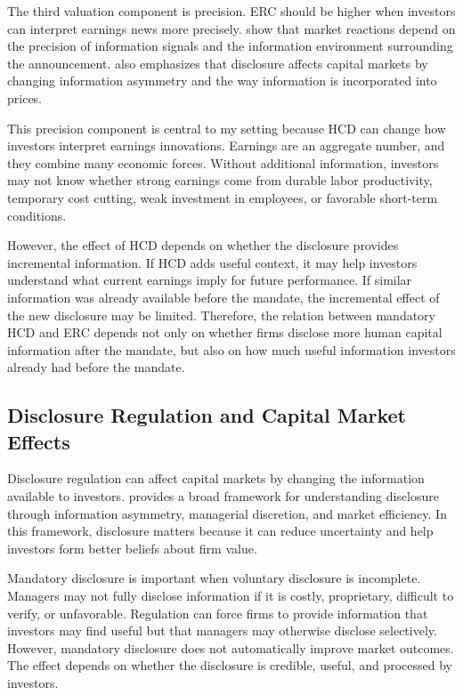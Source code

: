 \documentclass[12pt]{article}
\begin{document}
The third valuation component is precision. ERC should be higher when investors can interpret earnings news more precisely. \citet{holthausenVerrecchia1988} show that market reactions depend on the precision of information signals and the information environment surrounding the announcement. \citet{verrecchia2001} also emphasizes that disclosure affects capital markets by changing information asymmetry and the way information is incorporated into prices.

This precision component is central to my setting because HCD can change how investors interpret earnings innovations. Earnings are an aggregate number, and they combine many economic forces. Without additional information, investors may not know whether strong earnings come from durable labor productivity, temporary cost cutting, weak investment in employees, or favorable short-term conditions.

However, the effect of HCD depends on whether the disclosure provides incremental information. If HCD adds useful context, it may help investors understand what current earnings imply for future performance. If similar information was already available before the mandate, the incremental effect of the new disclosure may be limited. Therefore, the relation between mandatory HCD and ERC depends not only on whether firms disclose more human capital information after the mandate, but also on how much useful information investors already had before the mandate.

\subsection{Disclosure Regulation and Capital Market Effects}

Disclosure regulation can affect capital markets by changing the information available to investors. \citet{verrecchia2001} provides a broad framework for understanding disclosure through information asymmetry, managerial discretion, and market efficiency. In this framework, disclosure matters because it can reduce uncertainty and help investors form better beliefs about firm value.

Mandatory disclosure is important when voluntary disclosure is incomplete. Managers may not fully disclose information if it is costly, proprietary, difficult to verify, or unfavorable. Regulation can force firms to provide information that investors may find useful but that managers may otherwise disclose selectively. However, mandatory disclosure does not automatically improve market outcomes. The effect depends on whether the disclosure is credible, useful, and processed by investors.
\end{document}
